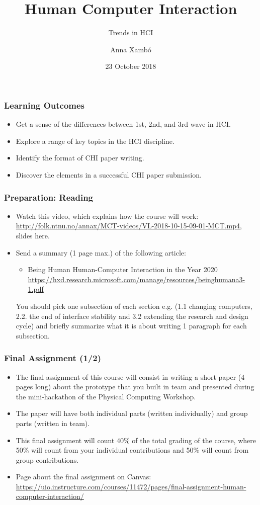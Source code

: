 \documentclass[screen, aspectratio=43]{beamer}
\title[HCI-intro]{Human Computer Interaction}
\subtitle{Trends in HCI}
\author[A. Xamb{\'o}]{Anna Xamb{\'o}}
\institute[NTNU]{Department of Music, NTNU}
\date{23 October 2018}
\begin{document}
\begin{frame}
  \titlepage
\end{frame}


\begin{frame}
\frametitle{Learning Outcomes}
\begin{itemize}
\item Get a sense of the differences between 1st, 2nd, and 3rd wave in HCI.
\item Explore a range of key topics in the HCI discipline.
\item Identify the format of CHI paper writing.
\item Discover the elements in a successful CHI paper submission.
\end{itemize}
\end{frame}
%
\begin{frame}
\frametitle{Preparation: Reading}
\begin{itemize}
\item Watch this video, which explains how the course will work: \url{http://folk.ntnu.no/annax/MCT-videos/VL-2018-10-15-09-01-MCT.mp4}, slides here.
\item Send a summary (1 page max.) of the following article:
\begin{itemize}
\item Being Human Human-Computer Interaction in the Year 2020 \cite{Harper.et.al.2008.being}\\
\url{https://hxd.research.microsoft.com/manage/resources/beinghumana3-1.pdf} 
\end{itemize}
You should pick one subsection of each section e.g. (1.1 changing computers, 2.2. the end of interface stability and 3.2 extending the research and design cycle) and briefly summarize what it is about writing 1 paragraph for each subsection.
\end{itemize}
\end{frame}
%
\begin{frame}
\frametitle{Final Assignment (1/2)}
{\small
\begin{itemize}
\item The final assignment of this course will consist in writing a short paper (4 pages long) about the prototype that you built in team and presented during the mini-hackathon of the Physical Computing Workshop.
\item The paper will have both individual parts (written individually) and group parts (written in team). 
\item This final assignment will count 40\% of the total grading of the course, where 50\% will count from your individual contributions and 50\% will count from group contributions.
\item Page about the final assignment on Canvas: \url{https://uio.instructure.com/courses/11472/pages/final-assignment-human-computer-interaction/}
\end{itemize}
}
\end{frame}
\end{document}
